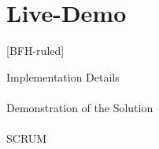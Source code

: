 \documentclass[
    ngerman,%
    authorontitle=true,
]{bfhbeamer}
\begin{document}
	\section{Live-Demo}
	[BFH-ruled]
	\frame{\sectionpage}


	\begin{frame}{Implementation Details}
		\framesubtitle{}
	\end{frame}


	\begin{frame}{Demonstration of the Solution}
		\framesubtitle{}
	\end{frame}

	\begin{frame}{SCRUM}
		\framesubtitle{}
	\end{frame}


\end{document}
